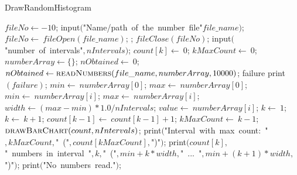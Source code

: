 \documentclass[a4paper,10pt]{article}
\begin{document}
\begin{algorithm}
\caption{DrawRandomHistogram}
\begin{algorithmic}[5]
\State {}
\State {}
  \State \(fileNo\gets-10\);
  \Repeat
    \State \(\)input\((\)"{}Name/path\ of\ the\ number\ file"{}\(file\_name)\);
    \State \(fileNo\gets\ fileOpen(file\_name)\);
  ;
    \State \(fileClose(fileNo)\);
    \State \(\)input\((\)"{}number\ of\ intervals"{}\(,nIntervals)\);
      \State \(count[k]\gets\ 0\);
    \EndFor
    \State \(kMaxCount\gets\ 0\);
    \State \(numberArray\gets\{\}\);
    \State \(nObtained\gets\ 0\);
    \Try
      \State \(nObtained\gets\Call{readNumbers}{file\_name,numberArray,10000}\);
    \EndTry
    \Catch failure
      \State \(\)print\((failure)\);
    \EndCatch %
      \State \(min\gets\ numberArray[0]\);
      \State \(max\gets\ numberArray[0]\);
          \State \(min\gets\ numberArray[i]\);
        \Else
            \State \(max\gets\ numberArray[i]\);
          \EndIf
        \EndIf
      \EndFor
      \State \(width\gets(max-min)*1.0/nIntervals\);
        \State \(value\gets\ numberArray[i]\);
        \State \(k\gets\ 1\);
          \State \(k\gets\ k+1\);
        \EndWhile
        \State \(count[k-1]\gets\ count[k-1]+1\);
          \State \(kMaxCount\gets\ k-1\);
        \EndIf
      \EndFor
      \State \(\Call{drawBarChart}{count,nIntervals}\);
      \State \(\)print\((\)"{}Interval\ with\ max\ count:\ "{}\(,kMaxCount,\)"{}\ ("{}\(,count[kMaxCount],\)"{})"{}\()\);
        \State \(\)print\((count[k],\)"{}\ numbers\ in\ interval\ "{}\(,k,\)"{}\ ("{}\(,min+k*width,\)"{}\ ...\ "{}\(,min+(k+1)*width,\)"{})"{}\()\);
      \EndFor
    \Else
      \State \(\)print\((\)"{}No\ numbers\ read."{}\()\);
    \EndIf
  \EndIf
\EndProcedure
\end{algorithmic}
\end{algorithm}
\end{document}
